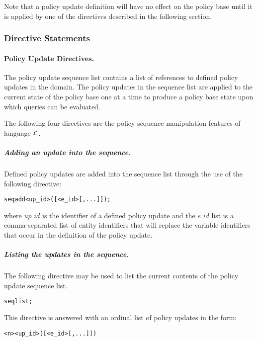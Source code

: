 \documentclass[11pt, twocolumn]{article}
\newenvironment{vverbatim}
  {\begin{alltt}}
  {\vspace{-\baselineskip}\end{alltt}}
\begin{document}
          Note that a policy update definition will have no effect on the
          policy base until it is applied by one of the directives described in
          the following section.

        \subsubsection{Directive Statements}

        \paragraph{Policy Update Directives.}

        The policy update sequence list contains a list of references to
        defined policy updates in the domain. The policy updates in the
        sequence list are applied to the current state of the policy base one
        at a time to produce a policy base state upon which queries can be
        evaluated.

        The following four directives are the policy sequence manipulation
        features of language $\cal{L}$.

        \subparagraph{Adding an update into the sequence.}
          Defined policy updates are added into the sequence list through the
          use of the following directive:

          \begin{vverbatim}
  seq add <up\_id>([<e\_id>[, ...]]);
          \end{vverbatim}

          \noindent where $up\_id$ is the identifier of a defined policy
          update and the $e\_id$ list is a comma-separated list of entity
          identifiers that will replace the variable identifiers that occur in
          the definition of the policy update.

        \subparagraph{Listing the updates in the sequence.}
          The following directive may be used to list the current contents of
          the policy update sequence list.

          \begin{vverbatim}
  seq list;
          \end{vverbatim}

          This directive is answered with an ordinal list of policy updates in
          the form:

          \begin{vverbatim}
  <n> <up\_id>([<e\_id>[, ...]])
          \end{vverbatim}
\end{document}
